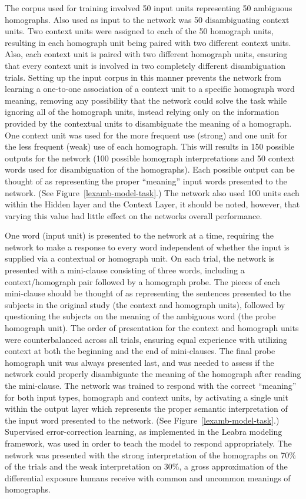 \documentclass[man]{apa}
\begin{document}
The corpus used for training involved 50 input units representing 50 ambiguous homographs.  Also used as input to the network was 50 disambiguating context units.  Two context units were assigned to each of the 50 homograph units, resulting in each homograph unit being paired with two different context units. Also, each context unit is paired with two different homograph units, ensuring that every context unit is involved in two completely different disambiguation trials.  Setting up the input corpus in this manner prevents the network from learning a one-to-one association of a context unit to a specific homograph word meaning, removing any possibility that the network could solve the task while ignoring all of the homograph units, instead relying only on the information provided by the contextual units to disambiguate the meaning of a homograph.  One context unit was used for the more frequent use (strong) and one unit for the less frequent (weak) use of each homograph.  This will results in 150 possible outputs for the network (100 possible homograph interpretations and 50 context words used for disambiguation of the homographs).  Each possible output can be thought of as representing the proper ``meaning'' input words presented to the network.  (See Figure~\ref{lexamb-model-task}.)  The network also used 100 units each within the Hidden layer and the Context Layer, it should be noted, however, that varying this value had little effect on the networks overall performance.

One word (input unit) is presented to the network at a time, requiring the network to make a response to every word independent of whether the input is supplied via a contextual or homograph unit.  On each trial, the network is presented with a mini-clause consisting of three words, including a context/homograph pair followed by a homograph probe. The pieces of each mini-clause should be thought of as representing the sentences presented to the subjects in the original study (the context and homograph units), followed by questioning the subjects on the meaning of the ambiguous word (the probe homograph unit).  The order of presentation for the context and homograph units were counterbalanced across all trials, ensuring equal experience with utilizing context at both the beginning and the end of mini-clauses.  The final probe homograph unit was always presented last, and was needed to assess if the network could properly disambiguate the meaning of the homograph after reading the mini-clause.  The network was trained to respond with the correct ``meaning'' for both input types, homograph and context units, by activating a single unit within the output layer which represents the proper semantic interpretation of the input word presented to the network. (See Figure~\ref{lexamb-model-task}.) Supervised error-correction learning, as implemented in the Leabra modeling framework, was used in order to teach the model to respond appropriately.  The network was presented with the strong interpretation of the homographs on 70\% of the trials and the weak interpretation on 30\%, a gross approximation of the differential exposure humans receive with common and uncommon meanings of homographs.  
\end{document}
